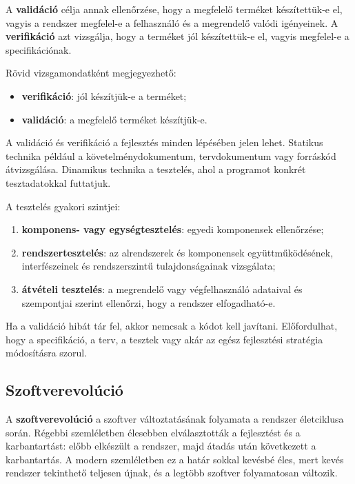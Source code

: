 A \textbf{validáció} célja annak ellenőrzése, hogy a megfelelő terméket készítettük-e el, vagyis a rendszer megfelel-e a felhasználó és a megrendelő valódi igényeinek. A \textbf{verifikáció} azt vizsgálja, hogy a terméket jól készítettük-e el, vagyis megfelel-e a specifikációnak.

Rövid vizsgamondatként megjegyezhető:

\begin{itemize}
  \item \textbf{verifikáció}: jól készítjük-e a terméket;
  \item \textbf{validáció}: a megfelelő terméket készítjük-e.
\end{itemize}

A validáció és verifikáció a fejlesztés minden lépésében jelen lehet. Statikus technika például a követelménydokumentum, tervdokumentum vagy forráskód átvizsgálása. Dinamikus technika a tesztelés, ahol a programot konkrét tesztadatokkal futtatjuk.

A tesztelés gyakori szintjei:

\begin{enumerate}
  \item \textbf{komponens- vagy egységtesztelés}: egyedi komponensek ellenőrzése;
  \item \textbf{rendszertesztelés}: az alrendszerek és komponensek együttműködésének, interfészeinek és rendszerszintű tulajdonságainak vizsgálata;
  \item \textbf{átvételi tesztelés}: a megrendelő vagy végfelhasználó adataival és szempontjai szerint ellenőrzi, hogy a rendszer elfogadható-e.
\end{enumerate}

Ha a validáció hibát tár fel, akkor nemcsak a kódot kell javítani. Előfordulhat, hogy a specifikáció, a terv, a tesztek vagy akár az egész fejlesztési stratégia módosításra szorul.

\subsection{Szoftverevolúció}

A \textbf{szoftverevolúció} a szoftver változtatásának folyamata a rendszer életciklusa során. Régebbi szemléletben élesebben elválasztották a fejlesztést és a karbantartást: előbb elkészült a rendszer, majd átadás után következett a karbantartás. A modern szemléletben ez a határ sokkal kevésbé éles, mert kevés rendszer tekinthető teljesen újnak, és a legtöbb szoftver folyamatosan változik.

